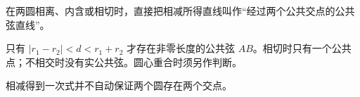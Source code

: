 \begin{trapbox}
	\medskip
	\begin{description}[style=nextline, leftmargin=2.8em, labelsep=0.5em, itemsep=0.35em]
		\item[\textbf{\textcolor{CTrap}{易错点五（没有检查相交条件）：}}] 在两圆相离、内含或相切时，直接把相减所得直线叫作“经过两个公共交点的公共弦直线”。
		\item[\textbf{\textcolor{CTrap}{正确理解（先确认相交于两点）：}}] 只有 $|r_1-r_2|<d<r_1+r_2$ 才存在非零长度的公共弦 $AB$。相切时只有一个公共点；不相交时没有实公共弦。圆心重合时须另作判断。
		\item[\textbf{\textcolor{CTrap}{错因分析（忘记适用范围）：}}] 相减得到一次式并不自动保证两个圆存在两个交点。
	\end{description}
\end{trapbox}
